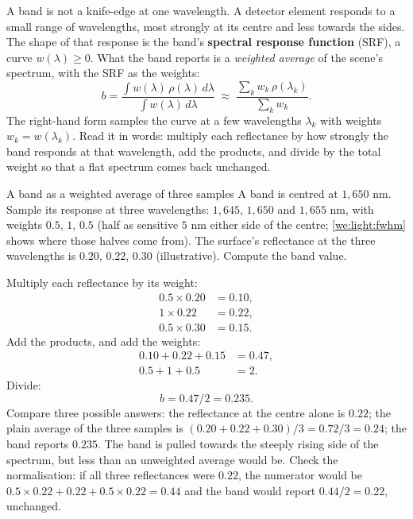 A band is not a knife-edge at one wavelength. A detector element responds to a small range of
wavelengths, most strongly at its centre and less towards the sides. The shape of that response
is the band's \textbf{spectral response function} (SRF), a
curve $w(\lambda) \ge 0$. What the band reports is a \emph{weighted average} of the scene's
spectrum, with the SRF as the weights:
\begin{equation}\label{eq:light:srf}
b = \frac{\int w(\lambda)\,\rho(\lambda)\,d\lambda}{\int w(\lambda)\,d\lambda}
\;\approx\; \frac{\sum_k w_k\,\rho(\lambda_k)}{\sum_k w_k}.
\end{equation}
The right-hand form samples the curve at a few wavelengths $\lambda_k$ with weights
$w_k = w(\lambda_k)$. Read it in words: multiply each reflectance by how strongly the band
responds at that wavelength, add the products, and divide by the total weight so that a flat
spectrum comes back unchanged.

\begin{worked}[label={we:light:srf}]{A band as a weighted average of three samples}
A band is centred at $1{,}650$ nm. Sample its response at three wavelengths: $1{,}645$, $1{,}650$
and $1{,}655$ nm, with weights $0.5$, $1$, $0.5$ (half as sensitive $5$ nm either side of the
centre; \cref{we:light:fwhm} shows where those halves come from). The surface's reflectance at the
three wavelengths is $0.20$, $0.22$, $0.30$ (illustrative\tagA). Compute the band value.

Multiply each reflectance by its weight:
\begin{align*}
0.5 \times 0.20 &= 0.10,\\
1 \times 0.22 &= 0.22,\\
0.5 \times 0.30 &= 0.15.
\end{align*}
Add the products, and add the weights:
\begin{align*}
0.10 + 0.22 + 0.15 &= 0.47,\\
0.5 + 1 + 0.5 &= 2.
\end{align*}
Divide:
\[ b = 0.47 / 2 = 0.235. \]
Compare three possible answers: the reflectance at the centre alone is $0.22$; the plain average of
the three samples is $(0.20 + 0.22 + 0.30)/3 = 0.72/3 = 0.24$; the band reports $0.235$. The band
is pulled towards the steeply rising side of the spectrum, but less than an unweighted average
would be. Check the normalisation: if all three reflectances were $0.22$, the numerator would be
$0.5\times0.22 + 0.22 + 0.5\times0.22 = 0.44$ and the band would report $0.44/2 = 0.22$, unchanged.
\end{worked}

